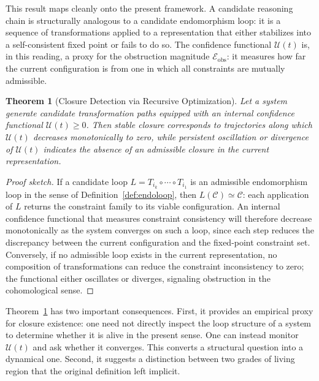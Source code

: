 \documentclass[11pt, a4paper]{article}
\theoremstyle{plain}
\newtheorem{theorem}{Theorem}[section]
\theoremstyle{definition}
\theoremstyle{remark}
\begin{document}
This result maps cleanly onto the present framework. A candidate reasoning chain is structurally analogous to a candidate endomorphism loop: it is a sequence of transformations applied to a representation that either stabilizes into a self-consistent fixed point or fails to do so. The confidence functional $\mathcal{U}(t)$ is, in this reading, a proxy for the obstruction magnitude $\mathcal{E}_{\mathrm{obs}}$: it measures how far the current configuration is from one in which all constraints are mutually admissible.

\begin{theorem}[Closure Detection via Recursive Optimization]
\label{thm:closuredetection}
Let a system generate candidate transformation paths equipped with an internal confidence functional $\mathcal{U}(t) \geq 0$. Then stable closure corresponds to trajectories along which $\mathcal{U}(t)$ decreases monotonically to zero, while persistent oscillation or divergence of $\mathcal{U}(t)$ indicates the absence of an admissible closure in the current representation.
\end{theorem}

\begin{proof}[Proof sketch]
If a candidate loop $L = T_{i_k} \circ \cdots \circ T_{i_1}$ is an admissible endomorphism loop in the sense of Definition~\ref{def:endoloop}, then $L(\mathcal{C}) \simeq \mathcal{C}$: each application of $L$ returns the constraint family to its viable configuration. An internal confidence functional that measures constraint consistency will therefore decrease monotonically as the system converges on such a loop, since each step reduces the discrepancy between the current configuration and the fixed-point constraint set. Conversely, if no admissible loop exists in the current representation, no composition of transformations can reduce the constraint inconsistency to zero; the functional either oscillates or diverges, signaling obstruction in the cohomological sense.
\end{proof}

Theorem~\ref{thm:closuredetection} has two important consequences. First, it provides an empirical proxy for closure existence: one need not directly inspect the loop structure of a system to determine whether it is alive in the present sense. One can instead monitor $\mathcal{U}(t)$ and ask whether it converges. This converts a structural question into a dynamical one. Second, it suggests a distinction between two grades of living region that the original definition left implicit.
\end{document}
